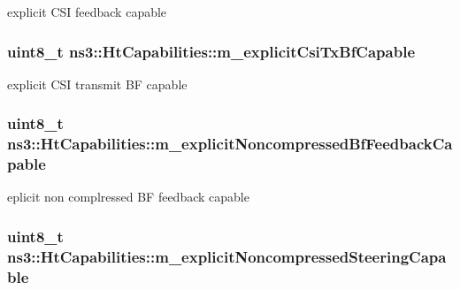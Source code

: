explicit C\+SI feedback capable 

\subsubsection[{\texorpdfstring{m\+\_\+explicit\+Csi\+Tx\+Bf\+Capable}{m_explicitCsiTxBfCapable}}]{\setlength{\rightskip}{0pt plus 5cm}uint8\+\_\+t ns3\+::\+Ht\+Capabilities\+::m\+\_\+explicit\+Csi\+Tx\+Bf\+Capable\hspace{0.3cm}{\ttfamily [private]}}\hypertarget{classns3_1_1HtCapabilities_af74335c78c6c9400e3766c853dd22f7a}{}\label{classns3_1_1HtCapabilities_af74335c78c6c9400e3766c853dd22f7a}


explicit C\+SI transmit BF capable 

\subsubsection[{\texorpdfstring{m\+\_\+explicit\+Noncompressed\+Bf\+Feedback\+Capable}{m_explicitNoncompressedBfFeedbackCapable}}]{\setlength{\rightskip}{0pt plus 5cm}uint8\+\_\+t ns3\+::\+Ht\+Capabilities\+::m\+\_\+explicit\+Noncompressed\+Bf\+Feedback\+Capable\hspace{0.3cm}{\ttfamily [private]}}\hypertarget{classns3_1_1HtCapabilities_a938d861ca3d9167c3beff00c2664098b}{}\label{classns3_1_1HtCapabilities_a938d861ca3d9167c3beff00c2664098b}


eplicit non complressed BF feedback capable 

\subsubsection[{\texorpdfstring{m\+\_\+explicit\+Noncompressed\+Steering\+Capable}{m_explicitNoncompressedSteeringCapable}}]{\setlength{\rightskip}{0pt plus 5cm}uint8\+\_\+t ns3\+::\+Ht\+Capabilities\+::m\+\_\+explicit\+Noncompressed\+Steering\+Capable\hspace{0.3cm}{\ttfamily [private]}}\hypertarget{classns3_1_1HtCapabilities_aa1b4195b8cbcd9c2d1189e862cfd694b}{}\label{classns3_1_1HtCapabilities_aa1b4195b8cbcd9c2d1189e862cfd694b}


